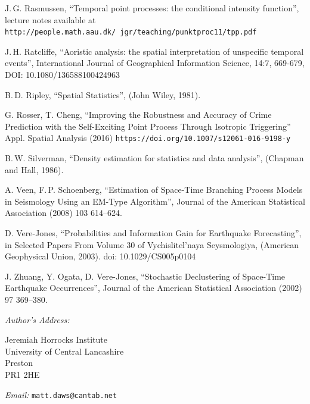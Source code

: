 \documentclass[twoside,a4paper]{article}
\theoremstyle{plain}
\theoremstyle{definition}
\begin{document}
\begin{thebibliography}{99}
 J.\,G. Rasmussen,
	``Temporal point processes: the conditional intensity function'',
	lecture notes available at \texttt{http://people.math.aau.dk/~jgr/teaching/punktproc11/tpp.pdf}

 J.\,H. Ratcliffe, ``Aoristic analysis: the spatial interpretation of unspecific
temporal events'', International Journal of Geographical Information Science, 14:7, 669-679, DOI:
10.1080/136588100424963

 B.\,D. Ripley,
	``Spatial Statistics'',
	(John Wiley, 1981).

 G. Rosser, T. Cheng, ``Improving the Robustness and Accuracy of Crime
	Prediction with the Self-Exciting Point Process Through Isotropic Triggering''
	Appl. Spatial Analysis (2016) \texttt{https://doi.org/10.1007/s12061-016-9198-y}

 B.\,W. Silverman,
	``Density estimation for statistics and data analysis'',
	(Chapman and Hall, 1986).

 A. Veen, F.\,P. Schoenberg,
	``Estimation of Space-Time Branching Process Models in Seismology Using an EM-Type Algorithm'',
	Journal of the American Statistical Association (2008) 103 614--624.

 D. Vere-Jones,
	``Probabilities and Information Gain for Earthquake Forecasting'',
	in Selected Papers From Volume 30 of Vychislitel'naya Seysmologiya,
	(American Geophysical Union, 2003).  doi: 10.1029/CS005p0104

 J. Zhuang, Y. Ogata, D. Vere-Jones,
	``Stochastic Declustering of Space-Time Earthquake Occurrences'',
	Journal of the American Statistical Association (2002) 97 369--380.

\end{thebibliography}


\vspace{5ex}

\noindent\emph{Author's Address:}
\parbox[t]{3in}{Jeremiah Horrocks Institute\\
University of Central Lancashire\\
Preston\\
PR1 2HE}

\bigskip\noindent\emph{Email:} \texttt{matt.daws@cantab.net}
\end{document}
